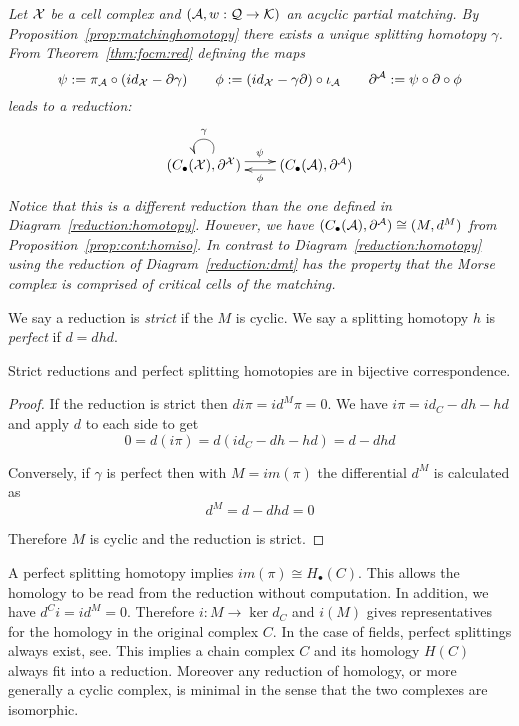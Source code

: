 \begin{ex}
{\em
Let ${\mathcal X}$ be a cell complex and $({\mathcal A},w:{\mathcal Q}\to {\mathcal K})$ an acyclic partial matching.  By Proposition~\ref{prop:matchinghomotopy} there exists a unique splitting homotopy $\gamma$.  From Theorem~\ref{thm:focm:red} defining the maps
$$\psi:=\pi_{\mathcal A}\circ (id_{\mathcal X}-\partial \gamma) \quad\quad  \phi:= (id_{\mathcal X}-\gamma \partial)\circ \iota_{\mathcal A} \quad\quad \partial^{\mathcal A}:= \psi\circ \partial\circ \phi $$
leads to a reduction:
\begin{align}\label{reduction:dmt}
\xymatrixrowsep{0.03in}
\xymatrixcolsep{0.3in}
\xymatrix{
(C_\bullet(\cX),\partial^\cX) \ar@(ur,ul)_{\gamma} \ar[r]<3pt>^{\psi} & \ar[l]<3pt>^{\phi} (C_\bullet(\cA),\partial^\cA) 
}
\end{align}
Notice that this is a different reduction than the one defined in Diagram~\ref{reduction:homotopy}.  However, we have $(C_\bullet({\mathcal A}),\partial^{\mathcal A}) \cong (M,d^M)$ from Proposition~\ref{prop:cont:homiso}.  In contrast to Diagram~\ref{reduction:homotopy} using the reduction of Diagram~\ref{reduction:dmt} has the property that the Morse complex is comprised of critical cells of the matching.   
}
\end{ex}


  We say a reduction is {\em strict} if the $M$ is cyclic.  We say a splitting homotopy $h$ is {\em perfect} if $d=dhd$. 

\begin{prop}
Strict reductions and perfect splitting homotopies are in bijective correspondence.
\end{prop}
\begin{proof}
If the reduction is strict then $di\pi = id^M\pi = 0$.  We have $i\pi = id_C-dh-hd$ and apply $d$ to each side to get $$0=d(i\pi) = d(id_C-dh-hd) = d-dhd$$

Conversely, if $\gamma$ is perfect then with $M=im(\pi)$ the differential $d^M$ is calculated as $$d^M=d-dhd=0$$ 

Therefore $M$ is cyclic and the reduction is strict.
\end{proof}

A perfect splitting homotopy implies $im(\pi)\cong H_\bullet (C)$.  This allows the homology to be read from the reduction without computation.  In addition, we have $d^Ci = id^M = 0$.  Therefore $i:M\to \ker d_C$ and $i(M)$ gives representatives for the homology in the original complex $C$. In the case of fields, perfect splittings always exist, see.  This implies a chain complex $C$ and its homology $H(C)$ always fit into a reduction. Moreover any reduction of homology, or more generally a cyclic complex, is minimal in the sense that the two complexes are isomorphic.


